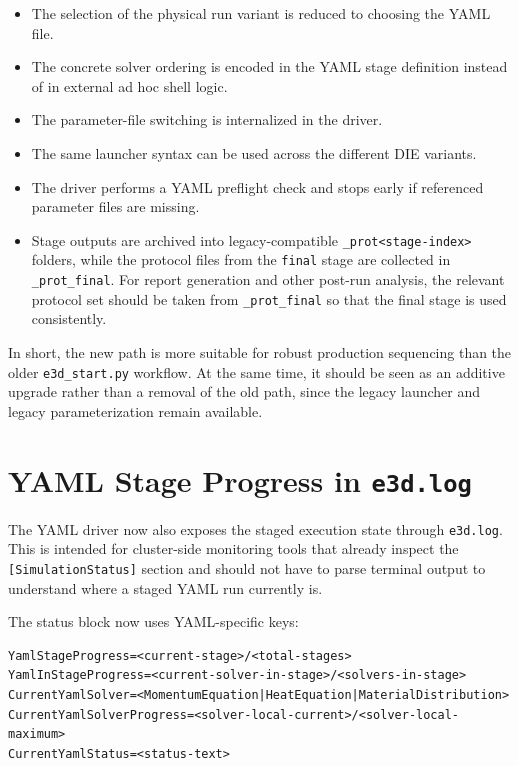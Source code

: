 \documentclass[11pt,a4paper]{article}
\begin{document}
\begin{itemize}[leftmargin=*]
  \item The selection of the physical run variant is reduced to choosing the YAML file.
  \item The concrete solver ordering is encoded in the YAML stage definition instead of in external ad hoc shell logic.
  \item The parameter-file switching is internalized in the driver.
  \item The same launcher syntax can be used across the different DIE variants.
  \item The driver performs a YAML preflight check and stops early if referenced parameter files are missing.
  \item Stage outputs are archived into legacy-compatible \texttt{\_prot<stage-index>} folders, while the protocol
        files from the \texttt{final} stage are collected in \texttt{\_prot\_final}. For report generation and other
        post-run analysis, the relevant protocol set should be taken from \texttt{\_prot\_final} so that the final
        stage is used consistently.
\end{itemize}

In short, the new path is more suitable for robust production sequencing than the older \texttt{e3d\_start.py}
workflow. At the same time, it should be seen as an additive upgrade rather than a removal of the old path, since
the legacy launcher and legacy parameterization remain available.

\section*{YAML Stage Progress in \texttt{e3d.log}}

The YAML driver now also exposes the staged execution state through \texttt{e3d.log}. This is intended for
cluster-side monitoring tools that already inspect the \texttt{[SimulationStatus]} section and should not have to
parse terminal output to understand where a staged YAML run currently is.

The status block now uses YAML-specific keys:

\begin{verbatim}
YamlStageProgress=<current-stage>/<total-stages>
YamlInStageProgress=<current-solver-in-stage>/<solvers-in-stage>
CurrentYamlSolver=<MomentumEquation|HeatEquation|MaterialDistribution>
CurrentYamlSolverProgress=<solver-local-current>/<solver-local-maximum>
CurrentYamlStatus=<status-text>
\end{verbatim}
\end{document}
